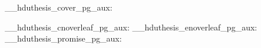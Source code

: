\RenewDocumentCommand \maketitle {}
  {
    \begin{titlepage}
      \__hduthesis_cover_pg_aux:
    \end{titlepage}
    \titlepage
    \__hduthesis_cnoverleaf_pg_aux:
    \endtitlepage
    \titlepage
      \__hduthesis_enoverleaf_pg_aux:
    \endtitlepage
    \titlepage
      \__hduthesis_promise_pg_aux:
    \endtitlepage
    \restoregeometry
  }

\makeatother
\endinput
